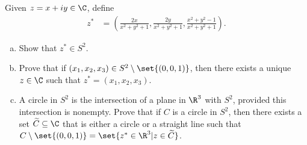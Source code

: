 \documentclass[10pt]{mypackage}
\begin{document}
\RaggedRight
\begin{problem}[Problem 1]
  Given $z = x + iy\in \C$, define
  \begin{align*}
    z^{\ast} &= \left( \frac{2x}{x^2 + y^2 + 1}, \frac{2y}{x^2 + y^2 + 1}, \frac{x^2 + y^2 - 1}{x^2 + y^2 + 1} \right).
  \end{align*}
  \begin{enumerate}[(a)]
    \item Show that $z^{\ast}\in S^2$.
    \item Prove that if $\left( x_1,x_2,x_3 \right)\in S^2\setminus \set{(0,0,1)}$, then there exists a unique $z\in \C$ such that $z^{\ast} = \left( x_1,x_2,x_3 \right)$.
    \item A circle in $S^2$ is the intersection of a plane in $\R^3$ with $S^2$, provided this intersection is nonempty. Prove that if $C$ is a circle in $S^{2}$, then there exists a set $\widetilde{C}\subseteq \C$ that is either a circle or a straight line such that $C\setminus \set{(0,0,1)} = \set{z^{\ast}\in \R^3 | z\in \widetilde{C}}$.
  \end{enumerate}
\end{problem}
\end{document}
